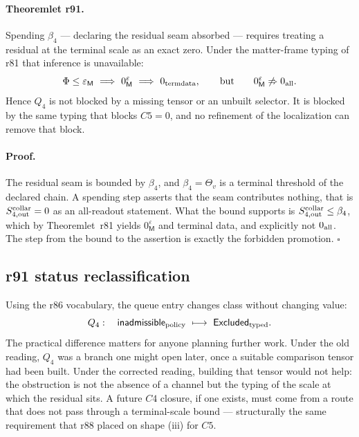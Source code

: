 \paragraph{Theoremlet r91.}
Spending \(\beta_4\) --- declaring the residual seam absorbed --- requires treating a residual
at the terminal scale as an exact zero.  Under the matter-frame typing of r81 that inference
is unavailable:
\[
\Phi\le\varepsilon_{\mathsf M}
\ \Longrightarrow\
0_{\mathsf M}^{\varepsilon}
\ \Longrightarrow\
0_{\rm termdata},
\qquad\text{but}\qquad
0_{\mathsf M}^{\varepsilon}\not\Rightarrow 0_{\rm all}.
\]
Hence \(Q_4\) is not blocked by a missing tensor or an unbuilt selector.  It is blocked by the
same typing that blocks \(C5=0\), and no refinement of the localization can remove that
block.

\paragraph{Proof.}
The residual seam is bounded by \(\beta_4\), and \(\beta_4=\Theta_v\) is a terminal threshold
of the declared chain.  A spending step asserts that the seam contributes nothing, that is
\(S_{4,\rm out}^{\rm collar}=0\) as an all-readout statement.  What the bound supports is
\(S_{4,\rm out}^{\rm collar}\le\beta_4\), which by
Theoremlet~r81 yields \(0_{\mathsf M}^{\varepsilon}\) and terminal data, and explicitly not
\(0_{\rm all}\).  The step from the bound to the assertion is exactly the forbidden
promotion. \(\square\)

\subsection*{r91 status reclassification}
\label{subsec:r91-status-reclassification}

Using the r86 vocabulary, the queue entry changes class without changing value:
\[
Q_4:\quad
\mathsf{inadmissible}_{\rm policy}
\ \longmapsto\
\mathsf{Excluded}_{\rm typed}.
\]
The practical difference matters for anyone planning further work.  Under the old reading,
\(Q_4\) was a branch one might open later, once a suitable comparison tensor had been built.
Under the corrected reading, building that tensor would not help: the obstruction is not the
absence of a channel but the typing of the scale at which the residual sits.  A future
\(C4\) closure, if one exists, must come from a route that does not pass through a
terminal-scale bound --- structurally the same requirement that r88 placed on shape (iii) for
\(C5\).

